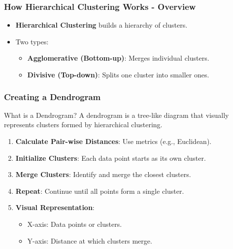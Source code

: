 \documentclass[aspectratio=169]{beamer}
\begin{document}
\begin{frame}[fragile]
    \frametitle{How Hierarchical Clustering Works - Overview}
    \begin{itemize}
        \item \textbf{Hierarchical Clustering} builds a hierarchy of clusters.
        \item Two types: 
        \begin{itemize}
            \item \textbf{Agglomerative (Bottom-up)}: Merges individual clusters.
            \item \textbf{Divisive (Top-down)}: Splits one cluster into smaller ones.
        \end{itemize}
    \end{itemize}
\end{frame}

\begin{frame}[fragile]
    \frametitle{Creating a Dendrogram}
    \begin{block}{What is a Dendrogram?}
        A dendrogram is a tree-like diagram that visually represents clusters formed by hierarchical clustering.
    \end{block}
    \begin{enumerate}
        \item \textbf{Calculate Pair-wise Distances}: Use metrics (e.g., Euclidean).
        \item \textbf{Initialize Clusters}: Each data point starts as its own cluster.
        \item \textbf{Merge Clusters}: Identify and merge the closest clusters.
        \item \textbf{Repeat}: Continue until all points form a single cluster.
        \item \textbf{Visual Representation}:
        \begin{itemize}
            \item X-axis: Data points or clusters.
            \item Y-axis: Distance at which clusters merge.
        \end{itemize}
    \end{enumerate}
\end{frame}
\end{document}
